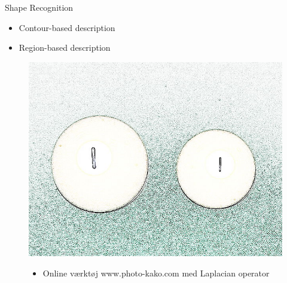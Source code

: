 \begin{frame}[fragile]{\insertsection}{Shape Recognition}
        \begin{itemize}
          \item Contour-based description
          \item Region-based description
        \end{itemize}
        \begin{figure}[ht]
\includegraphics[scale=0.1]{pictures/Simon/pool_ball_edges.jpg}
\centering
\begin{itemize}
\item Online værktøj www.photo-kako.com med Laplacian operator
\end{itemize}
\end{figure}
\end{frame}
